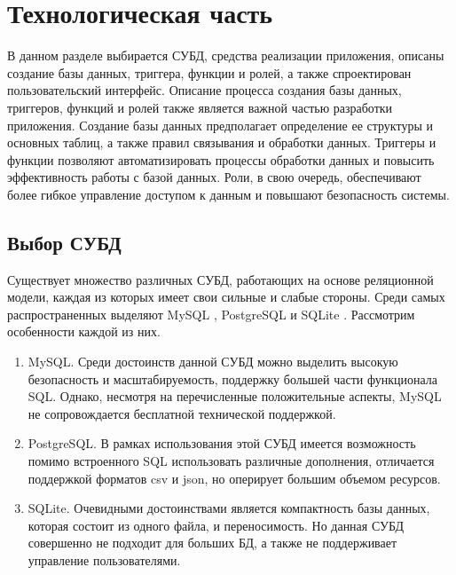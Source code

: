 \section{\large Технологическая часть}

В данном разделе выбирается СУБД, средства реализации приложения,
описаны создание базы данных, триггера, функции и ролей,
а также спроектирован пользовательский интерфейс. 
Описание процесса создания базы данных, триггеров, функций и ролей также является важной частью разработки приложения. Создание базы данных предполагает определение ее структуры и основных таблиц, а также правил связывания и обработки данных. Триггеры и функции позволяют автоматизировать процессы обработки данных и повысить эффективность работы с базой данных. Роли, в свою очередь, обеспечивают более гибкое управление доступом к данным и повышают безопасность системы.

\subsection{Выбор СУБД}

Существует множество различных СУБД, работающих на основе реляционной модели,
каждая из которых имеет свои сильные и слабые стороны.
Среди самых распространенных \cite{most_popular} выделяют MySQL \cite{mysql},
PostgreSQL \cite{postgresql} и SQLite \cite{sqlite}.
Рассмотрим особенности каждой из них.

\begin{enumerate}[label=\arabic*.]
    \item MySQL. Среди достоинств данной СУБД можно выделить высокую
          безопасность и масштабируемость,
          поддержку большей части функционала SQL. Однако, несмотря на
          перечисленные
          положительные аспекты,
          MySQL не сопровождается бесплатной технической поддержкой.
    \item PostgreSQL. В рамках использования этой СУБД имеется возможность
          помимо встроенного SQL использовать различные дополнения,
          отличается поддержкой форматов csv и json, но оперирует большим
          объемом
          ресурсов.
    \item SQLite. Очевидными достоинствами является компактность базы
          данных, которая состоит из одного файла,
          и переносимость.
          Но данная СУБД совершенно не подходит для больших БД, а также не
          поддерживает управление пользователями.
\end{enumerate}

